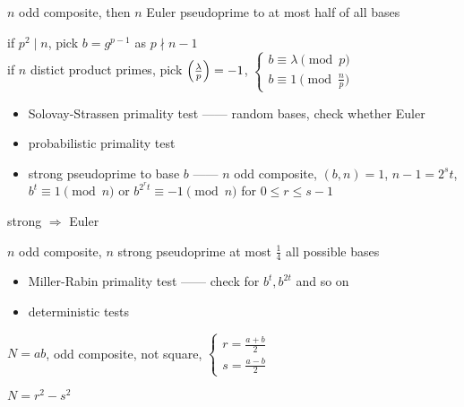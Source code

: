 \begin{prop}
    $n$ odd composite, then $n$ Euler pseudoprime to at most half of all bases
\end{prop}
\begin{pf}
    if $p^2 \mid n$, pick $b = g^{p-1}$ as $p \nmid n - 1$\\
    if $n$ distict product primes, pick $\left( \frac{\lambda}{p} \right) = -1$,
    $\begin{cases}
         b \equiv \lambda \pmod{p}\\
         b \equiv 1 \pmod{\frac{n}{p}}
    \end{cases}$
\end{pf}

\begin{itemize}
    \item Solovay-Strassen primality test ------ random bases, check whether Euler
    \item probabilistic primality test
    \item strong pseudoprime to base $b$ ------ $n$ odd composite, $(b, n) = 1$, $n - 1 = 2^s t$, $b^t \equiv 1 \pmod{n}$ or $b^{2^r t} \equiv -1 \pmod{n}$
    for $0 \leq r \leq s - 1$
\end{itemize}

\begin{prop}
    strong $\Rightarrow$ Euler
\end{prop}

\begin{thm}
    $n$ odd composite, $n$ strong pseudoprime at most $\frac{1}{4}$ all possible bases
\end{thm}

\begin{itemize}
    \item Miller-Rabin primality test ------ check for $b^t, b^{2t}$ and so on
    \item deterministic tests
\end{itemize}

\begin{setting}
    $N = ab$, odd composite, not square, $\begin{cases}
                                             r = \frac{a+b}{2}\\
                                             s = \frac{a-b}{2}
    \end{cases}$
\end{setting}

\begin{fact}
    $N = r^2 - s^2$
\end{fact}

